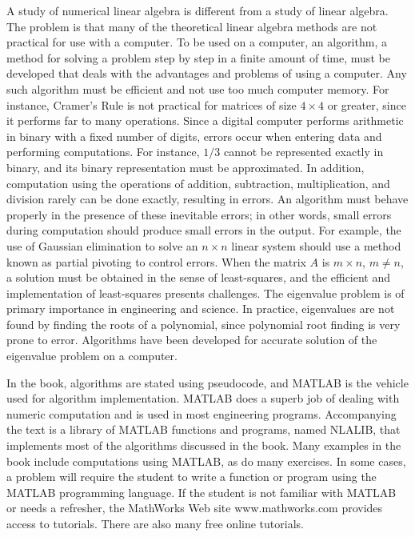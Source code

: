 \documentclass[../main.tex]{subfiles}
\begin{document}
A study of numerical linear algebra is different from a study of linear algebra. The problem is that many of the theoretical linear algebra methods are not practical for use with a computer. To be used on a computer, an algorithm, a method for solving a problem step by step in a finite amount of time, must be developed that deals with the advantages and problems of using a computer. Any such algorithm must be efficient and not use too much computer memory. For instance, Cramer’s Rule is not practical for matrices of size $4 \times 4$ or greater, since it performs far to many operations. Since a digital computer performs arithmetic in binary with a fixed number of digits, errors occur when entering data and performing computations. For instance, $1/3$ cannot be represented exactly in binary, and its binary representation must be approximated. In addition, computation using the operations of addition, subtraction, multiplication, and division rarely can be done exactly, resulting in errors. An algorithm must behave properly in the presence of these inevitable errors; in other words, small errors during computation should produce small errors in the output. For example, the use of Gaussian elimination to solve an $n \times n$ linear system should use a method known as partial pivoting to control errors. When the matrix $A$ is $m \times n$, $m \neq  n$, a solution must be obtained in the sense of least-squares, and the efficient and implementation of least-squares presents challenges. The eigenvalue problem is of primary importance in engineering and science. In practice, eigenvalues are not found by finding the roots of a polynomial, since polynomial root finding is very prone to error. Algorithms have been developed for accurate solution of the eigenvalue problem on a computer.

In the book, algorithms are stated using pseudocode, and MATLAB is the vehicle used for algorithm implementation. MATLAB does a superb job of dealing with numeric computation and is used in most engineering programs. Accompanying the text is a library of MATLAB functions and programs, named NLALIB, that implements most of the algorithms discussed in the book. Many examples in the book include computations using MATLAB, as do many exercises. In some cases, a problem will require the student to write a function or program using the MATLAB programming language. If the student is not familiar with MATLAB or needs a refresher, the MathWorks Web site www.mathworks.com provides access to tutorials. There are also many free online tutorials.
\end{document}
